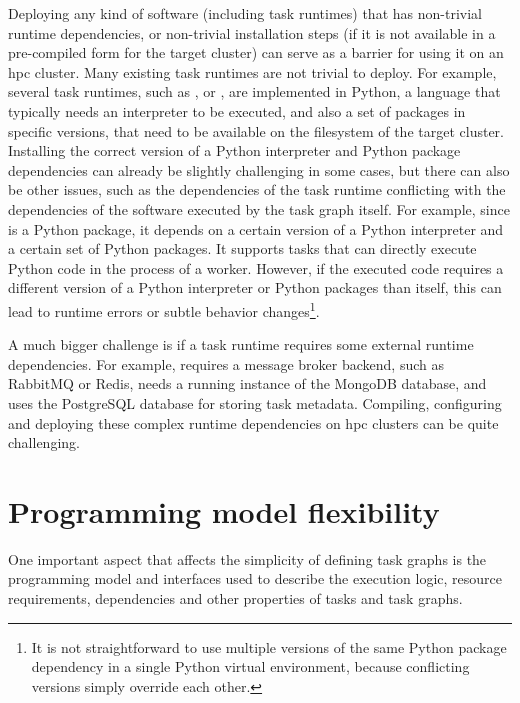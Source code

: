 Deploying any kind of software (including task runtimes) that has non-trivial runtime dependencies,
or non-trivial installation steps (if it is not available in a pre-compiled form for the target
cluster) can serve as a barrier for using it on an \gls{hpc} cluster. Many existing
task runtimes are not trivial to deploy. For example, several task runtimes, such as
\dask{}, \snakemake{} or \pycompss{}, are implemented in
Python, a language that typically needs an interpreter to be executed, and also a set of packages
in specific versions, that need to be available on the filesystem of the target cluster. Installing
the correct version of a Python interpreter and Python package dependencies can already be slightly
challenging in some cases, but there can also be other issues, such as the dependencies of the task
runtime conflicting with the dependencies of the software executed by the task graph itself. For
example, since \dask{} is a Python package, it depends on a certain version of a
Python interpreter and a certain set of Python packages. It supports tasks that can directly
execute Python code in the process of a \dask{} worker. However, if the executed
code requires a different version of a Python interpreter or Python packages than
\dask{} itself, this can lead to runtime errors or subtle behavior
changes\footnote{It is not straightforward to use multiple versions of the same Python package dependency in a
single Python virtual environment, because conflicting versions simply override each other.}.

A much bigger challenge is if a task runtime requires some external runtime dependencies. For
example, \merlin{} requires a message broker backend, such as RabbitMQ or Redis,
\fireworks{} needs a running instance of the MongoDB database, and
\balsam{} uses the PostgreSQL database for storing task metadata. Compiling,
configuring and deploying these complex runtime dependencies on \gls{hpc} clusters
can be quite challenging.

\section{Programming model flexibility}
One important aspect that affects the simplicity of defining task graphs is the programming
model and interfaces used to describe the execution logic, resource requirements, dependencies and
other properties of tasks and task graphs.

